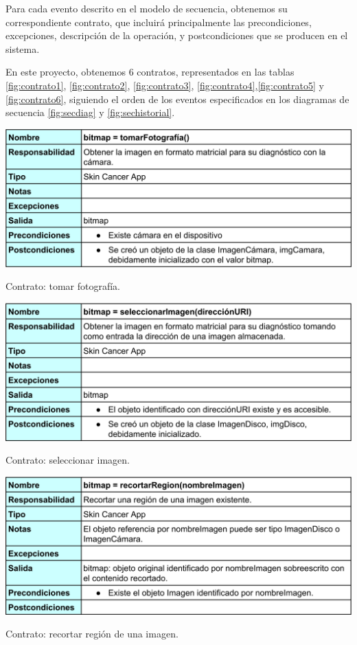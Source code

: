  Para cada evento descrito en el modelo de secuencia, obtenemos su correspondiente contrato, que incluirá principalmente las precondiciones, excepciones, descripción de la operación, y postcondiciones que se producen en el sistema.
 
 En este proyecto, obtenemos 6 contratos, representados en las tablas \ref{fig:contrato1}, \ref{fig:contrato2}, \ref{fig:contrato3}, \ref{fig:contrato4},\ref{fig:contrato5} y \ref{fig:contrato6}, siguiendo el orden de los eventos especificados en los diagramas de secuencia \ref{fig:secdiag} y \ref{fig:sechistorial}.
 
 \begin{table}[H]
 	\centering
 	\includegraphics[scale = 0.16]{imagenes/contrato1.png}
 	\caption{Contrato: tomar fotografía.}
 	\label{fig:contrato1}
 \end{table}
 
  \begin{table}[H]
 	\centering
 	\includegraphics[scale = 0.16]{imagenes/contrato2.png}
 	\caption{Contrato: seleccionar imagen.}
 	\label{fig:contrato2}
 \end{table}
 
   \begin{table}[H]
 	\centering
 	\includegraphics[scale = 0.16]{imagenes/contrato3.png}
 	\caption{Contrato: recortar región de una imagen.}
 	\label{fig:contrato3}
 \end{table}
 
